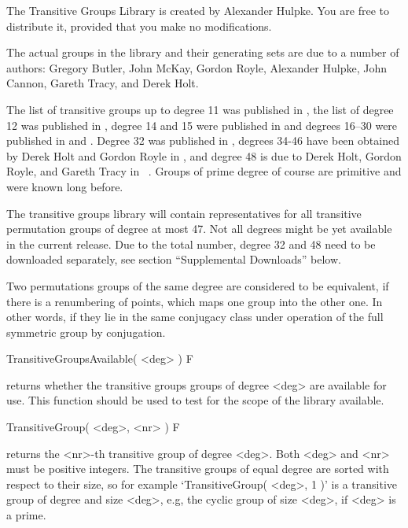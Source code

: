 
The Transitive Groups Library is created by Alexander Hulpke.
You are free to distribute it, provided that you make no modifications.

The actual groups in the library and their generating sets are due to a
number of authors:
Gregory Butler, John McKay, Gordon
Royle, Alexander Hulpke, John Cannon, Gareth Tracy, and Derek Holt. 

The list of transitive  groups up  to degree 11
was published in \cite{BM83},  the list of degree  12 was published in
\cite{Roy87}, degree 14 and  15 were published in  \cite{Butler93} and
degrees 16--30 were published in \cite{Hulpke96} and \cite{HulpkeTG}.
Degree 32 was published in \cite{CanHolt32}, degrees 34-46 have been
obtained by Derek Holt and Gordon Royle in \cite{HoltRoyle47},
and degree 48 is due to Derek Holt, Gordon Royle, and Gareth Tracy in
~\cite{HoltRoyleTracy48}.
Groups of prime degree of course are primitive and were known long before.

The transitive groups library will contain representatives for all
transitive permutation groups of degree at most  47. Not all degrees might
be yet available in the current release. Due to the total number,
degree 32 and 48 need to be downloaded separately, see section ``Supplemental
Downloads'' below.

Two permutations groups of the same degree are considered to be
equivalent, if there is a renumbering of points, which maps one group into
the other one.
In other words, if they lie in the same conjugacy class under operation
of the full symmetric group by conjugation.


\>TransitiveGroupsAvailable( <deg> ) F

returns whether the transitive groups groups of degree <deg> are available
for use. This function should be used to test for the scope of the library
available.

\>TransitiveGroup( <deg>, <nr> ) F

returns the <nr>-th transitive  group of degree <deg>.  Both  <deg> and
<nr> must be  positive integers. The transitive groups of equal  degree
are  sorted with  respect to   their  size, so for  example
`TransitiveGroup(  <deg>, 1 )' is a  transitive group  of degree and
size <deg>, e.g, the cyclic  group  of size <deg>,   if <deg> is a
prime.


